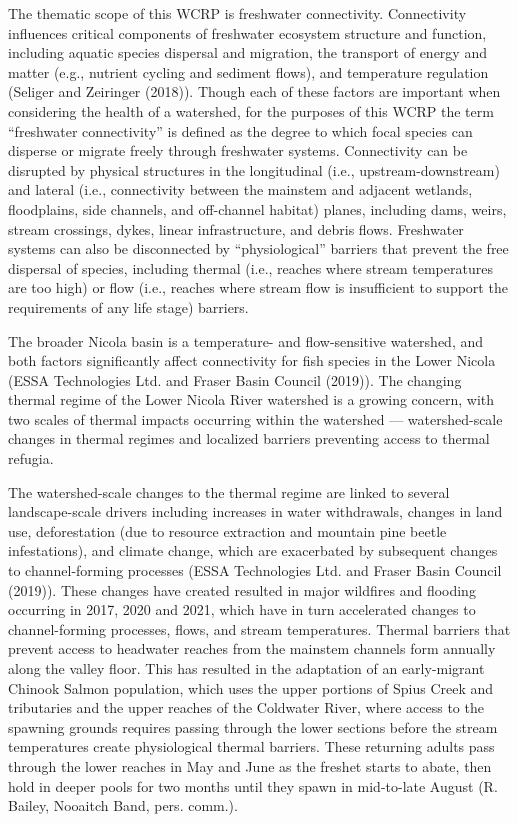 \documentclass[
  letterpaper,
  DIV=11,
  numbers=noendperiod]{scrreprt}
\begin{document}
The thematic scope of this WCRP is freshwater connectivity. Connectivity
influences critical components of freshwater ecosystem structure and
function, including aquatic species dispersal and migration, the
transport of energy and matter (e.g., nutrient cycling and sediment
flows), and temperature regulation (Seliger and Zeiringer (2018)).
Though each of these factors are important when considering the health
of a watershed, for the purposes of this WCRP the term ``freshwater
connectivity'' is defined as the degree to which focal species can
disperse or migrate freely through freshwater systems. Connectivity can
be disrupted by physical structures in the longitudinal (i.e.,
upstream-downstream) and lateral (i.e., connectivity between the
mainstem and adjacent wetlands, floodplains, side channels, and
off-channel habitat) planes, including dams, weirs, stream crossings,
dykes, linear infrastructure, and debris flows. Freshwater systems can
also be disconnected by ``physiological'' barriers that prevent the free
dispersal of species, including thermal (i.e., reaches where stream
temperatures are too high) or flow (i.e., reaches where stream flow is
insufficient to support the requirements of any life stage) barriers.

The broader Nicola basin is a temperature- and flow-sensitive watershed,
and both factors significantly affect connectivity for fish species in
the Lower Nicola (ESSA Technologies Ltd. and Fraser Basin Council
(2019)). The changing thermal regime of the Lower Nicola River watershed
is a growing concern, with two scales of thermal impacts occurring
within the watershed --- watershed-scale changes in thermal regimes and
localized barriers preventing access to thermal refugia.

The watershed-scale changes to the thermal regime are linked to several
landscape-scale drivers including increases in water withdrawals,
changes in land use, deforestation (due to resource extraction and
mountain pine beetle infestations), and climate change, which are
exacerbated by subsequent changes to channel-forming processes (ESSA
Technologies Ltd. and Fraser Basin Council (2019)). These changes have
created resulted in major wildfires and flooding occurring in 2017, 2020
and 2021, which have in turn accelerated changes to channel-forming
processes, flows, and stream temperatures. Thermal barriers that prevent
access to headwater reaches from the mainstem channels form annually
along the valley floor. This has resulted in the adaptation of an
early-migrant Chinook Salmon population, which uses the upper portions
of Spius Creek and tributaries and the upper reaches of the Coldwater
River, where access to the spawning grounds requires passing through the
lower sections before the stream temperatures create physiological
thermal barriers. These returning adults pass through the lower reaches
in May and June as the freshet starts to abate, then hold in deeper
pools for two months until they spawn in mid-to-late August (R. Bailey,
Nooaitch Band, pers. comm.).
\end{document}
